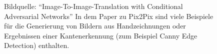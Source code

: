 \pagebreak

\begin{figure}[h]
	\centering
	\hspace{.5cm}
	\hspace{.5cm}
	\label{fig:pix2pixexamples_1}
\end{figure}

\begin{figure}[h]
	\centering
	\hspace{.5cm}
	\hspace{.5cm}
	\caption[Bildarithmetik]{Bildquelle: ``Image-To-Image-Translation with Conditional Adversarial Networks'' \cite{isola2018imagetoimage} \newline In dem Paper zu Pix2Pix sind viele Beispiele für die Generierung von Bildern aus Handzeichnungen oder Ergebnissen einer Kantenerkennung (zum Beispiel Canny Edge Detection) enthalten.}
	\label{fig:pix2pixexamples_2}
\end{figure}

